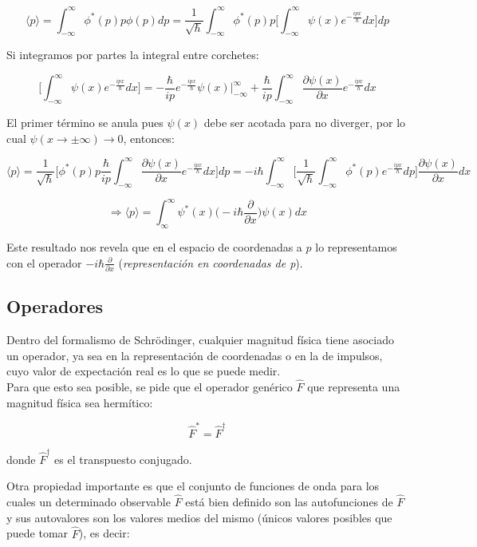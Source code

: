 \documentclass[a4paper]{article}
\begin{document}
$$\langle p \rangle = \int_{-\infty}^{\infty}\phi^{*}(p)p\phi(p)dp = \frac{1}{\sqrt{\hbar}}\int_{-\infty}^{\infty}\phi^{*}(p)p\bigg[\int_{-\infty}^{\infty} \psi(x)e^{-\frac{ipx}{\hbar}}dx \bigg]dp$$

Si integramos por partes la integral entre corchetes:

$$\bigg[\int_{-\infty}^{\infty} \psi(x)e^{-\frac{ipx}{\hbar}}dx \bigg] = -\frac{\hbar}{ip}e^{-\frac{ipx}{\hbar}}\psi(x)\bigg|_{-\infty}^{\infty} + \frac{\hbar}{ip}\int_{-\infty}^{\infty} \frac{\partial \psi(x)}{\partial x}e^{-\frac{ipx}{\hbar}}dx$$

El primer t\'ermino se anula pues $\psi(x)$ debe ser acotada para no diverger, por lo cual $\psi(x \rightarrow \pm \infty) \rightarrow 0$, entonces:

$$\langle p \rangle = \frac{1}{\sqrt{\hbar}}\bigg[ \phi^{*}(p)p\frac{\hbar}{ip}\int_{-\infty}^{\infty} \frac{\partial \psi(x)}{\partial x}e^{-\frac{ipx}{\hbar}}dx\bigg]dp = -i\hbar \int_{-\infty}^{\infty} \bigg[\frac{1}{\sqrt{\hbar}}\int_{-\infty}^{\infty} \phi^{*}(p)e^{-\frac{ipx}{\hbar}}dp \bigg]\frac{\partial \psi(x)}{\partial x}dx$$

\begin{equation}
\label{eq:pmean}
\Rightarrow \langle p \rangle = \int_{\infty}^{\infty} \psi^{*}(x)\bigg( -i\hbar \frac{\partial}{\partial x}\bigg)\psi(x)dx
\end{equation}

Este resultado nos revela que en el espacio de coordenadas a $p$ lo representamos con el operador $-i\hbar \frac{\partial}{\partial x}$ (\textit{representaci\'on en coordenadas de p}).

\subsection{Operadores}

Dentro del formalismo de Schr\"odinger, cualquier magnitud f\'isica tiene asociado un operador, ya sea en la representaci\'on de coordenadas o en la de impulsos, cuyo valor de expectaci\'on real es lo que se puede medir.\\

Para que esto sea posible, se pide que el operador gen\'erico $\hat{F}$ que representa una magnitud f\'isica sea herm\'itico:

$$\hat{F}^{*} = \hat{F}^{\dagger}$$

donde $\hat{F}^{\dagger}$ es el transpuesto conjugado.

Otra propiedad importante es que el conjunto de funciones de onda para los cuales un determinado observable $\hat{F}$ est\'a bien definido son las autofunciones de $\hat{F}$ y sus autovalores son los valores medios del mismo (\'unicos valores posibles que puede tomar $\hat{F}$), es decir:
\end{document}
